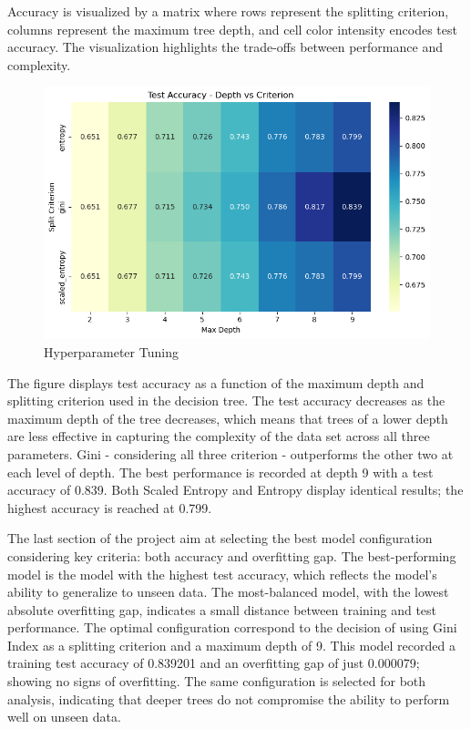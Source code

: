 \documentclass{article}
\begin{document}
Accuracy is visualized by a matrix where rows represent the splitting criterion, columns represent the maximum tree depth, and cell color intensity encodes test accuracy. The visualization highlights the trade-offs between performance and complexity.


\begin{figure}[H]
\centering

\includegraphics[width=0.7\linewidth]{Hyperparameter Tuning.png}
\caption{\label{fig:frog}Hyperparameter Tuning}
\end{figure}


The figure displays test accuracy as a function of the maximum depth and splitting criterion used in the decision tree. The test accuracy decreases as the maximum depth of the tree decreases, which means that trees of a lower depth are less effective in capturing the complexity of the data set across all three parameters.
Gini - considering all three criterion - outperforms the other two at each level of depth. The best performance is recorded at depth 9 with a test accuracy of 0.839. Both Scaled Entropy and Entropy display identical results; the highest accuracy is reached at 0.799.

The last section of the project aim at selecting the best model configuration considering key criteria: both accuracy and overfitting gap. The best-performing model is the model with the highest test accuracy, which reflects the model’s ability to generalize to unseen data. The most-balanced model, with the lowest absolute overfitting gap, indicates a small distance between training and test performance. The optimal configuration correspond to the decision of using Gini Index as a splitting criterion and a maximum depth of 9. This model recorded a training test accuracy of 0.839201 and an overfitting gap of just 0.000079; showing no signs of overfitting. The same configuration is selected for both analysis, indicating that deeper trees do not compromise the ability to perform well on unseen data.
\end{document}
